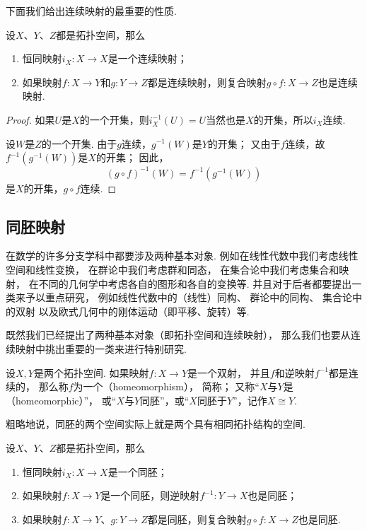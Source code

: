 下面我们给出连续映射的最重要的性质.

\begin{theorem}\label{theorem:拓扑学.拓扑空间之间的连续映射的性质}
设\(X\)、\(Y\)、\(Z\)都是拓扑空间，那么
\begin{enumerate}
\item 恒同映射\(i_X\colon X \to X\)是一个连续映射；
\item 如果映射\(f\colon X \to Y\)和\(g\colon Y \to Z\)都是连续映射，则复合映射\(g \circ f\colon X \to Z\)也是连续映射.
\end{enumerate}
\begin{proof}
如果\(U\)是\(X\)的一个开集，则\(i_X^{-1}(U) = U\)当然也是\(X\)的开集，所以\(i_X\)连续.

设\(W\)是\(Z\)的一个开集.
由于\(g\)连续，\(g^{-1}(W)\)是\(Y\)的开集；
又由于\(f\)连续，故\(f^{-1}(g^{-1}(W))\)是\(X\)的开集；
因此，\[
(g \circ f)^{-1}(W) = f^{-1}(g^{-1}(W))
\]是\(X\)的开集，\(g \circ f\)连续.
\end{proof}
\end{theorem}

\subsection{同胚映射}
在数学的许多分支学科中都要涉及两种基本对象.
例如在线性代数中我们考虑线性空间和线性变换，
在群论中我们考虑群和同态，
在集合论中我们考虑集合和映射，
在不同的几何学中考虑各自的图形和各自的变换等.
并且对于后者都要提出一类来予以重点研究，
例如线性代数中的（线性）同构、
群论中的同构、
集合论中的双射
以及欧式几何中的刚体运动（即平移、旋转）等.

既然我们已经提出了两种基本对象（即拓扑空间和连续映射），
那么我们也要从连续映射中挑出重要的一类来进行特别研究.

\begin{definition}\label{definition:拓扑学.同胚映射的概念}
设\(X,Y\)是两个拓扑空间.
如果映射\(f\colon X \to Y\)是一个双射，
并且\(f\)和逆映射\(f^{-1}\)都是连续的，
那么称\(f\)为一个（homeomorphism），
简称；
又称“\(X\)与\(Y\)是（homeomorphic）”，
或“\(X\)与\(Y\)同胚”，或“\(X\)同胚于\(Y\)”，记作\(X \cong Y\).
\end{definition}

粗略地说，同胚的两个空间实际上就是两个具有相同拓扑结构的空间.

\begin{theorem}\label{theorem:拓扑学.同胚映射的性质}
设\(X\)、\(Y\)、\(Z\)都是拓扑空间，那么
\begin{enumerate}
\item 恒同映射\(i_X\colon X \to X\)是一个同胚；
\item 如果映射\(f\colon X \to Y\)是一个同胚，则逆映射\(f^{-1}\colon Y \to X\)也是同胚；
\item 如果映射\(f\colon X \to Y\)、\(g\colon Y \to Z\)都是同胚，则复合映射\(g \circ f\colon X \to Z\)也是同胚.
\end{enumerate}
\end{theorem}

